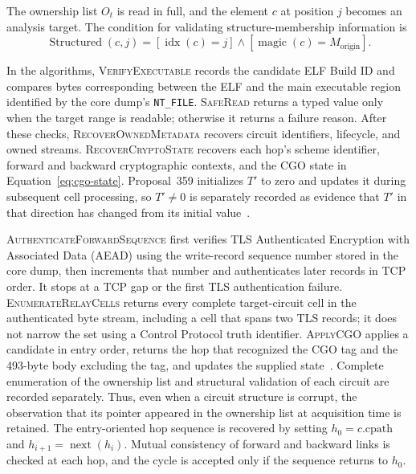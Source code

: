 \documentclass[10pt,a4paper]{article}
\newcommand{\code}[1]{\nolinkurl{#1}}
\begin{document}
The ownership list $O_t$ is read in full, and the element $c$ at position $j$ becomes an analysis target. The condition for validating structure-membership information is
\begin{equation}
\operatorname{Structured}(c,j)=
[\operatorname{idx}(c)=j]\land[\operatorname{magic}(c)=M_{\mathrm{origin}}].
\label{eq:structured}
\end{equation}

In the algorithms, \textsc{VerifyExecutable} records the candidate ELF Build ID and compares bytes corresponding between the ELF and the main executable region identified by the core dump's \code{NT_FILE}. \textsc{SafeRead} returns a typed value only when the target range is readable; otherwise it returns a failure reason. After these checks, \textsc{RecoverOwnedMetadata} recovers circuit identifiers, lifecycle, and owned streams. \textsc{RecoverCryptoState} recovers each hop's scheme identifier, forward and backward cryptographic contexts, and the CGO state in Equation~\eqref{eq:cgo-state}. Proposal~359 initializes $T'$ to zero and updates it during subsequent cell processing, so $T'\neq0$ is separately recorded as evidence that $T'$ in that direction has changed from its initial value~\cite{torproposal359,ctorsource04916}.

\textsc{AuthenticateForwardSequence} first verifies TLS Authenticated Encryption with Associated Data (AEAD) using the write-record sequence number stored in the core dump, then increments that number and authenticates later records in TCP order. It stops at a TCP gap or the first TLS authentication failure. \textsc{EnumerateRelayCells} returns every complete target-circuit cell in the authenticated byte stream, including a cell that spans two TLS records; it does not narrow the set using a Control Protocol truth identifier. \textsc{ApplyCGO} applies a candidate in entry order, returns the hop that recognized the CGO tag and the 493-byte body excluding the tag, and updates the supplied state~\cite{torproposal359}.
Complete enumeration of the ownership list and structural validation of each circuit are recorded separately. Thus, even when a circuit structure is corrupt, the observation that its pointer appeared in the ownership list at acquisition time is retained.
The entry-oriented hop sequence is recovered by setting $h_0=c.\mathrm{cpath}$ and $h_{i+1}=\operatorname{next}(h_i)$. Mutual consistency of forward and backward links is checked at each hop, and the cycle is accepted only if the sequence returns to $h_0$.
\end{document}
